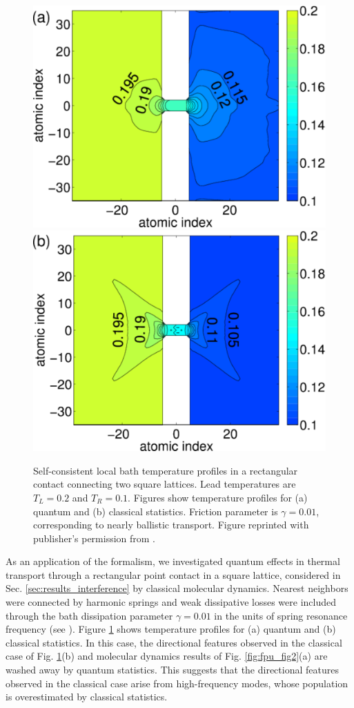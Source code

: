 % 



\begin{figure}
 \includegraphics[width=.49\columnwidth]{pics/gf_fig7a.pdf}
 \includegraphics[width=.49\columnwidth]{pics/gf_fig7b.pdf}
 \caption{Self-consistent local bath temperature profiles in a rectangular contact connecting two square lattices. Lead temperatures are $T_L=0.2$ and $T_R=0.1$. Figures show temperature profiles for (a) quantum and (b) classical statistics. Friction parameter is $\gamma=0.01$, corresponding to nearly ballistic transport. Figure reprinted with publisher's permission from .}
 \label{fig:gf_fig7}
\end{figure}

As an application of the formalism, we investigated quantum effects in thermal transport through a rectangular point contact in a square lattice, considered in Sec. \ref{sec:results_interference} by classical molecular dynamics. Nearest neighbors were connected by harmonic springs and weak dissipative losses were included through the bath dissipation parameter $\gamma=0.01$ in the units of spring resonance frequency (see ). Figure \ref{fig:gf_fig7} shows temperature profiles for (a) quantum and (b) classical statistics. In this case, the directional features observed in the classical case of Fig. \ref{fig:gf_fig7}(b) and molecular dynamics results of Fig. \ref{fig:fpu_fig2}(a) are washed away by quantum statistics. This suggests that the directional features observed in the classical case arise from high-frequency modes, whose population is overestimated by classical statistics.

